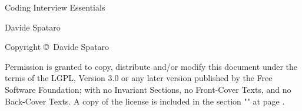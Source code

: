 \begin{center}
    \vspace*{2cm}
    
    {
        \Huge
        \test Coding Interview Essentials
    }

    \vspace{0.5cm}
     {
     }
         
    \vspace{1.5cm}
    
    {
        \Large
        Davide Spataro
    }

    \vfill
             
         
    \vspace{0.8cm}
  
         
\end{center} 
    



\null\vfill
\noindent
Copyright \copyright \the\year\ Davide Spataro\par
Permission is granted to copy, distribute and/or modify this document under the terms of the LGPL, Version 3.0 or any later version published by the Free Software Foundation; with no Invariant Sections, no Front-Cover Texts, and no Back-Cover Texts. A copy of the license is included in the section "" at page \pageref{license:gnu}. 




